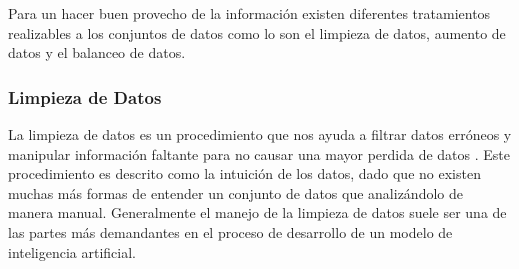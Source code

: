 \documentclass[letter,12pt]{report}
\begin{document}
Para un hacer buen provecho de la información existen diferentes tratamientos realizables
a los conjuntos de datos como lo son el limpieza de datos, aumento de datos y el balanceo
de datos.

\subsubsection{Limpieza de Datos}
La limpieza de datos es un procedimiento que nos ayuda a filtrar datos erróneos y
manipular información faltante para no causar una mayor perdida de datos \cite{Clean}.
Este procedimiento es descrito como la intuición de los datos, dado que no existen muchas
más formas de entender un conjunto de datos que analizándolo de manera manual.
Generalmente el manejo de la limpieza de datos suele ser una de las partes más
demandantes en el proceso de desarrollo de un modelo de inteligencia artificial.
\end{document}
